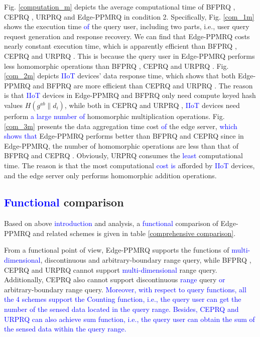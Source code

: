 \documentclass[IEEE JOURNAL OF BIOMEDICAL AND HEALTH INFORMATICS]{IEEEtran}
\begin{document}
{Fig. \ref{computation_m} depicts the average computational time of BFPRQ \cite{mahdikhani2020IoT}, CEPRQ \cite{hasan2020IoT}, URPRQ \cite{mahdikhani2020using} and Edge-PPMRQ in condition 2. Specifically, Fig. \ref{com_1m} shows the execution time \textcolor{blue}{of} the query user, including two parts, i.e., user query request generation and response recovery. We can find that Edge-PPMRQ costs nearly constant execution time, which is apparently efficient than BFPRQ \cite{mahdikhani2020IoT}, CEPRQ \cite{hasan2020IoT} and URPRQ \cite{mahdikhani2020using}. This is because the query user in Edge-PPMRQ performs less homomorphic operations than BFPRQ \cite{mahdikhani2020IoT}, CEPRQ \cite{hasan2020IoT} and URPRQ \cite{mahdikhani2020using}. Fig. \ref{com_2m} depicts \textcolor{blue}{IIoT} devices' data response time, which shows that both Edge-PPMRQ and BFPRQ \cite{mahdikhani2020IoT} are more efficient than CEPRQ \cite{hasan2020IoT} and URPRQ \cite{mahdikhani2020using}. The reason is that \textcolor{blue}{IIoT} devices in Edge-PPMRQ and BFPRQ \cite{mahdikhani2020IoT} only need compute keyed hash values $H( g^{ab} \| d_i)$, while both in CEPRQ \cite{hasan2020IoT} and URPRQ \cite{mahdikhani2020using}, \textcolor{blue}{IIoT} devices need perform \textcolor{blue}{a large number of} homomorphic multiplication operations. Fig. \ref{com_3m} presents the data aggregation time cost \textcolor{blue}{of} the edge server, \textcolor{blue}{which shows that} Edge-PPMRQ performs better than BFPRQ \cite{mahdikhani2020IoT} and CEPRQ \cite{hasan2020IoT} since in Edge-PPMRQ, the number of homomorphic operations are less than that of BFPRQ \cite{mahdikhani2020IoT} and CEPRQ \cite{hasan2020IoT}. Obviously, URPRQ \cite{mahdikhani2020using} consumes the \textcolor{blue}{least} computational time. The reason is that the most computational \textcolor{blue}{cost is} afforded by \textcolor{blue}{IIoT} devices, and the edge server only performs homomorphic addition operations.



\subsection{\textcolor{blue}{Functional} comparison}
Based on above \textcolor{blue}{introduction} and analysis, a \textcolor{blue}{functional} comparison of Edge-PPMRQ and related schemes is given in table \ref{comprehensive comparison}.

From a functional point of view, Edge-PPMRQ supports the functions of \textcolor{blue}{multi-dimensional}, discontinuous and arbitrary-boundary range query, while BFPRQ \cite{mahdikhani2020IoT}, CEPRQ \cite{hasan2020IoT} and URPRQ  \cite{mahdikhani2020using} cannot support \textcolor{blue}{multi-dimensional} range query. Additionally, CEPRQ \cite{hasan2020IoT} also cannot support discontinuous \textcolor{blue}{range} query \textcolor{blue}{or} arbitrary-boundary range query. \textcolor{blue}{ Moreover, with respect to query functions, all the 4 schemes support the \textcolor{blue}{Counting} function, i.e., the query user can get the number of the sensed data located in the query range. Besides, CEPRQ and URPRQ can also achieve sum function, i.e., the query user can obtain the sum of the sensed data within the query range.}

}
\end{document}
